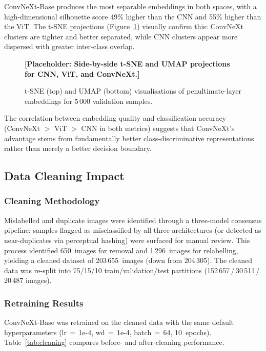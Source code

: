 ConvNeXt-Base produces the most separable embeddings in both spaces,
with a high-dimensional silhouette score 49\% higher than the CNN and
55\% higher than the ViT.  The t-SNE projections
(Figure~\ref{fig:tsne}) visually confirm this: ConvNeXt clusters are
tighter and better separated, while CNN clusters appear more dispersed
with greater inter-class overlap.

\begin{figure}[ht]
\centering
\textbf{[Placeholder: Side-by-side t-SNE and UMAP projections for
CNN, ViT, and ConvNeXt.]}
\caption{t-SNE (top) and UMAP (bottom) visualisations of
         penultimate-layer embeddings for 5\,000 validation samples.}
\label{fig:tsne}
\end{figure}

The correlation between embedding quality and classification accuracy
(ConvNeXt $>$ ViT $>$ CNN in both metrics) suggests that ConvNeXt's
advantage stems from fundamentally better class-discriminative
representations rather than merely a better decision boundary.

\subsection{Data Cleaning Impact}\label{sec:cleaning}

\subsubsection{Cleaning Methodology}

Mislabelled and duplicate images were identified through a three-model
consensus pipeline: samples flagged as misclassified by all three
architectures (or detected as near-duplicates via perceptual hashing)
were surfaced for manual review.  This process identified 650~images
for removal and 1\,296~images for relabelling, yielding a cleaned
dataset of 203\,655~images (down from 204\,305).  The cleaned data was
re-split into 75/15/10 train/validation/test partitions
(152\,657\,/\,30\,511\,/\,20\,487 images).

\subsubsection{Retraining Results}

ConvNeXt-Base was retrained on the cleaned data with the same default
hyperparameters (lr$\,{=}\,$1e-4, wd$\,{=}\,$1e-4, batch$\,{=}\,$64,
10~epochs).  Table~\ref{tab:cleaning} compares before- and
after-cleaning performance.

